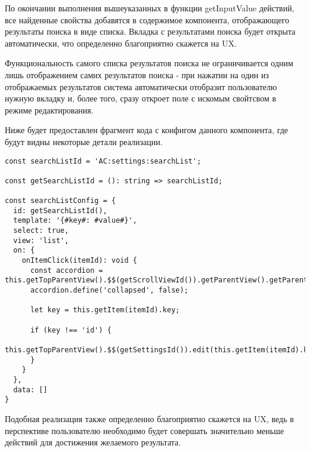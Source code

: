 По окончании выполнения вышеуказанных в функции getInputValue действий, все найденные свойства добавятся в содержимое компонента, отображающего результаты поиска в виде списка. Вкладка с результатами поиска будет открыта автоматически, что определенно благоприятно скажется на UX.

Функциональность самого списка результатов поиска не ограничивается одним лишь отображением самих результатов поиска - при нажатии на один из отображаемых результатов система автоматически отобразит пользователю нужную вкладку и, более того, сразу откроет поле с искомым свойтсвом в режиме редактирования.

Ниже будет предоставлен фрагмент кода с конфигом данного компонента, где будут видны некоторые детали реализации.

\begin{lstlisting}
const searchListId = 'AC:settings:searchList';

const getSearchListId = (): string => searchListId;

const searchListConfig = {
  id: getSearchListId(),
  template: '{#key#: #value#}',
  select: true,
  view: 'list',
  on: {
    onItemClick(itemId): void {
      const accordion = this.getTopParentView().$$(getScrollViewId()).getParentView().getParentView();
      accordion.define('collapsed', false);

      let key = this.getItem(itemId).key;

      if (key !== 'id') {
        this.getTopParentView().$$(getSettingsId()).edit(this.getItem(itemId).key);
      }
    }
  },
  data: []
}
\end{lstlisting}

Подобная реализация также определенно благоприятно скажется на UX, ведь в перспективе пользователю необходимо будет совершать значительно меньше действий для достижения желаемого результата.